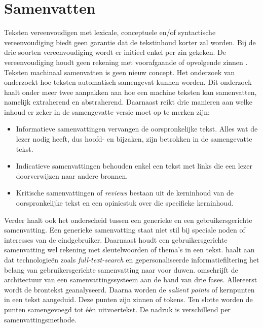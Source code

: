 \section{Samenvatten}

Teksten vereenvoudigen met lexicale, conceptuele en/of syntactische vereenvoudiging biedt geen garantie dat de tekstinhoud korter zal worden. Bij de drie soorten vereenvoudiging wordt er initieel enkel per zin gekeken. De vereenvoudiging houdt geen rekening met voorafgaande of opvolgende zinnen \autocite{Dubay2004}. Teksten machinaal samenvatten is geen nieuw concept. Het onderzoek van \textcite{Hahn2000} onderzoekt hoe teksten automatisch samengevat kunnen worden. Dit onderzoek haalt onder meer twee aanpakken aan hoe een machine teksten kan samenvatten, namelijk extraherend en abstraherend. Daarnaast reikt \textcite{Hahn2000} drie manieren aan welke inhoud er zeker in de samengevatte versie moet op te merken zijn:

\begin{itemize}
	\item Informatieve samenvattingen vervangen de oorspronkelijke tekst. Alles wat de lezer nodig heeft, dus hoofd- en bijzaken, zijn betrokken in de samengevatte tekst.
	\item Indicatieve samenvattingen behouden enkel een tekst met links die een lezer doorverwijzen naar andere bronnen. 
	\item Kritische samenvattingen of \textit{reviews} bestaan uit de kerninhoud van de oorspronkelijke tekst en een opiniestuk over die specifieke kerninhoud.
\end{itemize}

Verder haalt \textcite{Hahn2000} ook het onderscheid tussen een generieke en een gebruikersgerichte samenvatting. Een generieke samenvatting staat niet stil bij speciale noden of interesses van de eindgebruiker. Daarnaast houdt een gebruikersgerichte samenvatting wel rekening met sleutelwoorden of thema's in een tekst. \textcite{Hahn2000} haalt aan dat technologieën zoals \textit{full-text-search} en gepersonaliseerde informatiefiltering het belang van gebruikersgerichte samenvatting naar voor duwen. \textcite{Hahn2000} omschrijft de architectuur van een samenvattingssysteem aan de hand van drie fases. Allereerst wordt de brontekst geanalyseerd. Daarna worden de \textit{salient points} of kernpunten in een tekst aangeduid. Deze punten zijn zinnen of tokens. Ten slotte worden de punten samengevoegd tot één uitvoertekst. De nadruk is verschillend per samenvattingsmethode.

